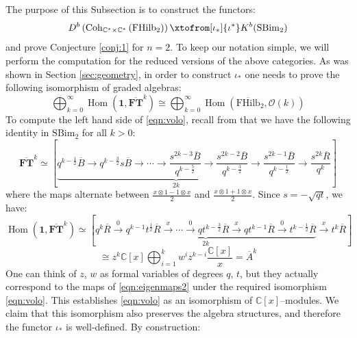 \documentclass[12pt]{amsart}
\numberwithin{equation}{section}
\theoremstyle{definition}
\theoremstyle{remark}
\DeclareMathOperator{\Hom}{Hom}
\newcommand{\CC}{\mathbb{C}}
\newcommand{\CO}{\mathcal{O}}
\newcommand{\bFT}{\overline{\FT}}
\newcommand{\FT}{\mathbf{FT}}
\renewcommand{\1}{\mathbf{1}}
\newcommand{\coh}{\mathrm{Coh}}
\newcommand{\FH}{\mathrm{FHilb}}
\newcommand{\SBim}{\mathrm{SBim}}
\newcommand{\torus}{\CC^{*} \times \CC^*}
\newcommand{\bA}{\overline{A}}
\newcommand{\bFH}{\overline{\FH}}
\newcommand{\Rred}{\overline{R}}
\newcommand{\Bred}{\overline{B}}
\begin{document}
The purpose of this Subsection is to construct the functors:
\begin{equation}
\label{eqn:functors n=2}
D^b\left(\coh_{\torus} \left( \FH_2\right) \right) \xtofrom[\iota_*]{\iota^*} K^b(\SBim_2)
\end{equation}
and prove Conjecture \ref{conj:1} for $n=2$. To keep our notation simple, we will perform the computation for the reduced versions of the above categories. As was shown in Section \ref{sec:geometry}, in order to construct $\iota_*$ one needs to prove the following isomorphism of graded algebras:
\begin{equation}
\label{eqn:volo}
\bigoplus_{k=0}^\infty \Hom \left(\1,\bFT^{k}\right) \cong \bigoplus_{k=0}^\infty \Hom \left( \bFH_2,\CO(k) \right)  
\end{equation}
To compute the left hand side of \eqref{eqn:volo}, recall from \cite{Kh} that we have the following identity in $\SBim_2$ for all $k>0$:
$$
\bFT^{k}\simeq \left[\underbrace{q^{k-\frac 12}\Bred \rightarrow q^{k-\frac 32} s \Bred \rightarrow \cdots \rightarrow \frac {s^{2k-3} \Bred}{q^{k-\frac 52}} \rightarrow \frac {s^{2k-2} \Bred}{q^{k-\frac 32}} \rightarrow \frac {s^{2k-1} \Bred}{q^{k-\frac 12}}}_{2k} \rightarrow \frac {s^{2k} \Rred}{q^k} \right]  %
$$
where the maps alternate between $\frac {x \otimes 1 - 1 \otimes x}2$ and $\frac {x \otimes 1 + 1 \otimes x}2$. Since $s=-\sqrt{qt}$, we have:
$$
\Hom(\1,\bFT^{k}) \simeq \left[\underbrace{q^k \Rred \stackrel{0}\rightarrow q^{k-1} t^{\frac 12} \Rred \xrightarrow{x} \cdots \stackrel{0}\rightarrow q  t^{k-\frac 32} \Rred \xrightarrow{x} q t^{k-1} \Rred \stackrel{0}\rightarrow t^{k-\frac 12} \Rred}_{2k} \xrightarrow{x} t^k \Rred \right]   %
$$
\begin{equation}
\label{eqn:hom}
\cong z^k \CC[x] \bigoplus_{i=1}^{k}w^{i} z^{k-i} \frac {\CC[x]}x  = \bA^k %
\end{equation}
One can think of $z$, $w$ as formal variables of degrees $q$, $t$, but they actually correspond to the maps of \eqref{eqn:eigenmaps2} under the required isomorphism \eqref{eqn:volo}. This establishes \eqref{eqn:volo} as an isomorphism of $\CC[x]$--modules. We claim that this isomorphism also preserves the algebra structures, and therefore the functor $\iota_*$ is well-defined. By construction:
\end{document}
